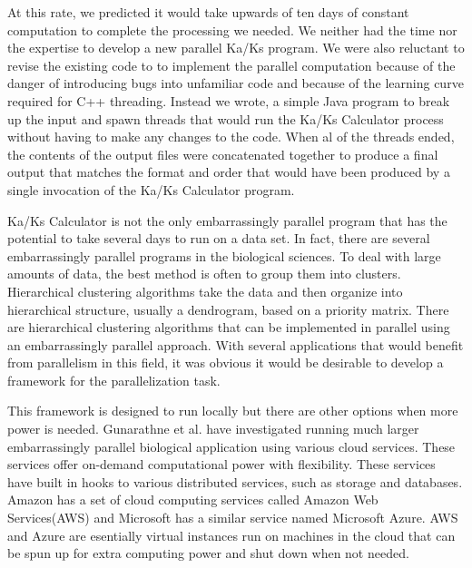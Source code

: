 \documentclass[12pt]{article}
\begin{document}
At this rate, we predicted it would take upwards of ten days of constant
computation to complete the processing we needed. We neither had the time nor
the expertise to develop a new parallel Ka/Ks program. We were also reluctant to
revise the existing code to to implement the parallel computation because of the
danger of introducing bugs into unfamiliar code and because of the learning
curve required for C++ threading. Instead we wrote, a simple Java program to
break up the input and spawn threads that would run the Ka/Ks Calculator process
without having to make any changes to the code. When al of the threads ended,
the contents of the output files were concatenated together to produce a final
output that matches the format and order that would have been produced by a
single invocation of the Ka/Ks Calculator program.

Ka/Ks Calculator is not the only embarrassingly parallel program that has the
potential to take several days to run on a data set. In fact, there are several
embarrassingly parallel programs in the biological sciences. To deal with large
amounts of data, the best method is often to group them into clusters.
Hierarchical clustering algorithms take the data and then organize into
hierarchical structure, usually a dendrogram, based on a priority matrix. There
are hierarchical clustering algorithms that can be implemented in parallel using
an embarrassingly parallel approach.  With several applications that would
benefit from parallelism in this field, it was obvious it would be desirable to
develop a framework for the parallelization task. \cite{cluster}

This framework is designed to run locally but there are other options when more
power is needed. Gunarathne et al.\cite{cloud} have investigated running much
larger embarrassingly parallel biological application using various cloud
services. These services offer on-demand computational power with flexibility.
These services have built in hooks to various distributed services, such as
storage and databases. Amazon has a set of cloud computing services called
Amazon Web Services(AWS) and Microsoft has a similar service named Microsoft
Azure. AWS and Azure are esentially virtual instances run on machines in the
cloud that can be spun up for extra computing power and shut down when not
needed. 
\end{document}

